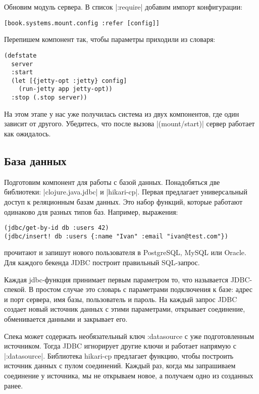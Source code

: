Обновим модуль сервера. В список \spverb|:require| добавим импорт конфигурации:

\begin{verbatim}
[book.systems.mount.config :refer [config]]
\end{verbatim}

Перепишем компонент так, чтобы параметры приходили из словаря:

\begin{verbatim}
(defstate
  server
  :start
  (let [{jetty-opt :jetty} config]
    (run-jetty app jetty-opt))
  :stop (.stop server))
\end{verbatim}

На этом этапе у нас уже получилась система из двух компонентов, где один зависит
от другого. Убедитесь, что после вызова \spverb|(mount/start)| сервер работает как
ожидалось.

\subsection{База данных}

Подготовим компонент для работы с базой данных. Понадобяться две библиотеки:
\spverb|clojure.java.jdbc| и \spverb|hikari-cp|. Первая предлагает универсальный доступ к
реляционным базам данных. Это набор функций, которые работают одинаково для
разных типов баз. Например, выражения:

\begin{verbatim}
(jdbc/get-by-id db :users 42)
(jdbc/insert! db :users {:name "Ivan" :email "ivan@test.com"})
\end{verbatim}

прочитают и запишут нового пользователя в PostgreSQL, MySQL или Oracle. Для
каждого бекенда JDBC построит правильный SQL-запрос.

Каждая jdbc-функция принимает первым параметром то, что называется
JDBC-спекой. В простом случае это словарь с параметрами подключения к базе:
адрес и порт сервера, имя базы, пользователь и пароль. На каждый запрос JDBC
создает новый источник данных с этими параметрами, открывает соединение,
обменивается данными и закрывает его.

Спека может содержать необязательный ключ :datasource с уже подготовленным
источником. Тогда JDBC игнорирует другие ключи и работает напрямую с
\spverb|:datasource|. Библиотека hikari-cp предлагает функцию, чтобы построить источник
данных с пулом соединений. Каждый раз, когда мы запрашиваем соединение у
источника, мы не открываем новое, а получаем одно из созданных ранее.


